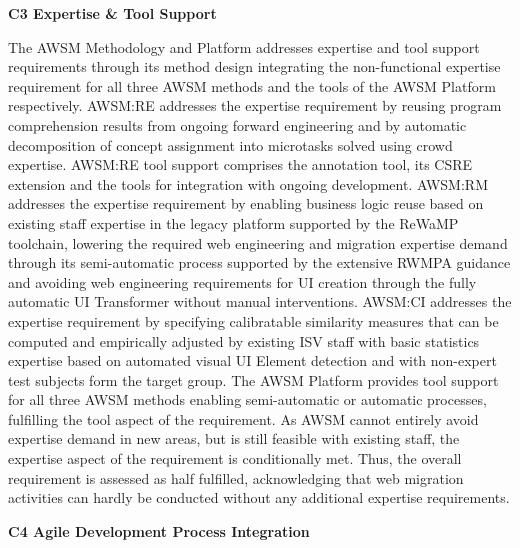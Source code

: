 \textbf{C3 Expertise \& Tool Support}

The AWSM Methodology and Platform addresses expertise and tool support requirements through its method design integrating the non-functional expertise requirement for all three AWSM methods and the tools of the AWSM Platform respectively.
AWSM:RE addresses the expertise requirement by reusing program comprehension results from ongoing forward engineering and by automatic decomposition of concept assignment into microtasks solved using crowd expertise.
AWSM:RE tool support comprises the annotation tool, its CSRE extension and the tools for integration with ongoing development.
AWSM:RM addresses the expertise requirement by enabling business logic reuse based on existing staff expertise in the legacy platform supported by the ReWaMP toolchain, lowering the required web engineering and migration expertise demand through its semi-automatic process supported by the extensive RWMPA guidance and avoiding web engineering requirements for UI creation through the fully automatic UI Transformer without manual interventions.
AWSM:CI addresses the expertise requirement by specifying calibratable similarity measures that can be computed and empirically adjusted by existing ISV staff with basic statistics expertise based on automated visual UI Element detection and with non-expert test subjects form the target group.
The AWSM Platform provides tool support for all three AWSM methods enabling semi-automatic or automatic processes, fulfilling the tool aspect of the requirement.
As AWSM cannot entirely avoid expertise demand in new areas, but is still feasible with existing staff, the expertise aspect of the requirement is conditionally met.
Thus, the overall requirement is assessed as half fulfilled, acknowledging that web migration activities can hardly be conducted without any additional expertise requirements.

\textbf{C4 Agile Development Process Integration}

